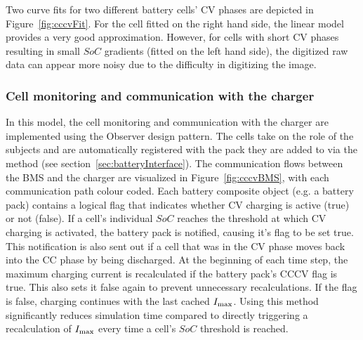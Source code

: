 Two curve fits for two different battery cells' CV phases are depicted in Figure~\ref{fig:cccvFit}. For the cell fitted on the right hand side, the linear model provides a very good approximation. However, for cells with short CV phases resulting in small $SoC$ gradients (fitted on the left hand side), the digitized raw data can appear more noisy due to the difficulty in digitizing the image.

\subsubsection{Cell monitoring and communication with the charger}
\label{sec:BMS}
In this model, the cell monitoring and communication with the charger are implemented using the Observer design pattern. The cells take on the role of the subjects and are automatically registered with the pack they are added to via the  method (see section~\ref{sec:batteryInterface}). The communication flows between the BMS and the charger are visualized in Figure~\ref{fig:cccvBMS}, with each communication path colour coded. Each battery composite object (e.g. a battery pack) contains a logical flag that indicates whether CV charging is active (true) or not (false). If a cell's individual $SoC$ reaches the threshold at which CV charging is activated, the battery pack is notified, causing it's flag to be set true. This notification is also sent out if a cell that was in the CV phase moves back into the CC phase by being discharged. At the beginning of each time step, the maximum charging current is recalculated if the battery pack's CCCV flag is true. This also sets it false again to prevent unnecessary recalculations. If the flag is false, charging continues with the last cached $I_\text{max}$. Using this method significantly reduces simulation time compared to directly triggering a recalculation of $I_\text{max}$ every time a cell's $SoC$ threshold is reached.  
